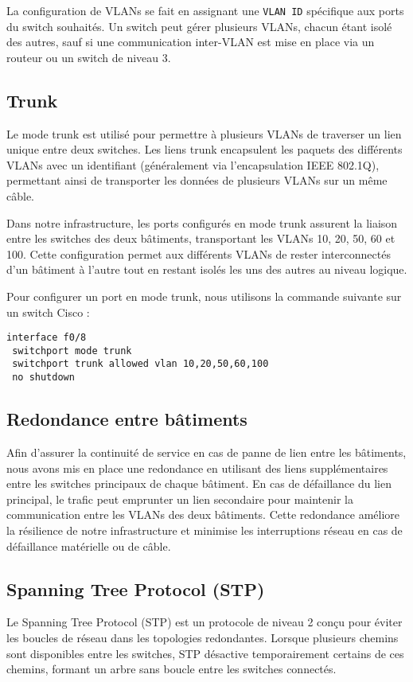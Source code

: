 \documentclass[a4paper,12pt]{report}
\begin{document}
La configuration de VLANs se fait en assignant une \texttt{VLAN ID} spécifique aux ports du switch souhaités. Un switch peut gérer plusieurs VLANs, chacun étant isolé des autres, sauf si une communication inter-VLAN est mise en place via un routeur ou un switch de niveau 3.

\subsection{Trunk}
Le mode trunk est utilisé pour permettre à plusieurs VLANs de traverser un lien unique entre deux switches. Les liens trunk encapsulent les paquets des différents VLANs avec un identifiant (généralement via l'encapsulation IEEE 802.1Q), permettant ainsi de transporter les données de plusieurs VLANs sur un même câble.

Dans notre infrastructure, les ports configurés en mode trunk assurent la liaison entre les switches des deux bâtiments, transportant les VLANs 10, 20, 50, 60 et 100. Cette configuration permet aux différents VLANs de rester interconnectés d'un bâtiment à l'autre tout en restant isolés les uns des autres au niveau logique. 

Pour configurer un port en mode trunk, nous utilisons la commande suivante sur un switch Cisco :

\begin{verbatim}
interface f0/8
 switchport mode trunk
 switchport trunk allowed vlan 10,20,50,60,100
 no shutdown
\end{verbatim}

\subsection{Redondance entre bâtiments}
Afin d'assurer la continuité de service en cas de panne de lien entre les bâtiments, nous avons mis en place une redondance en utilisant des liens supplémentaires entre les switches principaux de chaque bâtiment. En cas de défaillance du lien principal, le trafic peut emprunter un lien secondaire pour maintenir la communication entre les VLANs des deux bâtiments. Cette redondance améliore la résilience de notre infrastructure et minimise les interruptions réseau en cas de défaillance matérielle ou de câble.

\subsection{Spanning Tree Protocol (STP)}
Le Spanning Tree Protocol (STP) est un protocole de niveau 2 conçu pour éviter les boucles de réseau dans les topologies redondantes. Lorsque plusieurs chemins sont disponibles entre les switches, STP désactive temporairement certains de ces chemins, formant un arbre sans boucle entre les switches connectés. 
\end{document}
